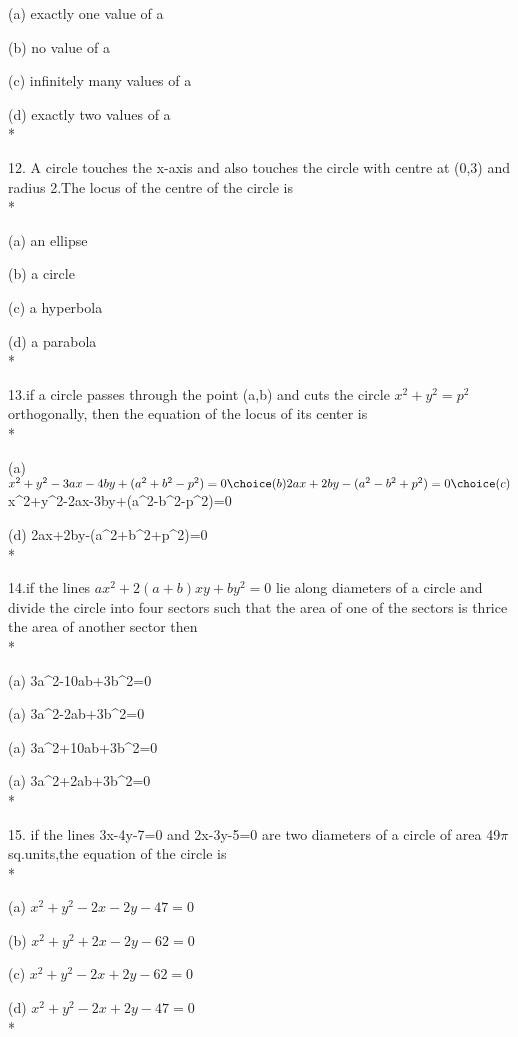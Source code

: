 \documentclass{article}
\begin{document}
\choice (a) exactly one value of a 

\choice (b) no value of a 

\choice (c) infinitely many values of a

\choice (d) exactly two values of a\\*

12. A circle touches the x-axis and also touches the circle with centre at (0,3) and radius 2.The locus of the centre of the circle is\\*

\choice (a) an ellipse

\choice (b) a circle 

\choice (c) a hyperbola

\choice (d) a parabola\\*

13.if a circle passes through the point (a,b) and cuts the circle $x^2+y^2=p^2$ orthogonally, then the equation of the locus of its center is\\*

\choice (a) $x^2+y^2-3ax-4by+(a^2+b^2-p^2)=0

\choice (b) 2ax+2by-(a^2-b^2+p^2)=0

\choice (c) $x^2+y^2-2ax-3by+(a^2-b^2-p^2)=0

\choice (d) 2ax+2by-(a^2+b^2+p^2)=0\\*

14.if the lines $ax^2+2(a+b)xy+by^2=0$ lie along diameters of a circle and divide the circle into four sectors such that the area of one of the sectors is thrice the area of another sector then\\*

\choice (a) 3a^2-10ab+3b^2=0

\choice (a) 3a^2-2ab+3b^2=0

\choice (a) 3a^2+10ab+3b^2=0

\choice (a) 3a^2+2ab+3b^2=0\\*

15. if the lines 3x-4y-7=0 and 2x-3y-5=0 are two diameters of a circle of area 49$\pi$ sq.units,the equation of the circle is\\*

\choice (a) $x^2+y^2-2x-2y-47=0$ 

\choice (b) $x^2+y^2+2x-2y-62=0$ 

\choice (c) $x^2+y^2-2x+2y-62=0$ 

\choice (d) $x^2+y^2-2x+2y-47=0$ \\*
\end{document}

